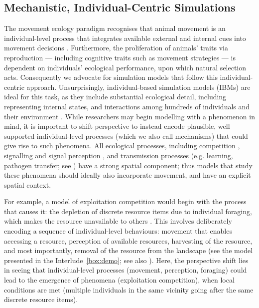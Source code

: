 \subsection*{Mechanistic, Individual-Centric Simulations}

The movement ecology paradigm recognises that animal movement is an individual-level process that integrates available external and internal cues into movement decisions \parencite{nathan2008a,holyoak2008}.
Furthermore, the proliferation of animals' traits via reproduction --- including cognitive traits such as movement strategies --- is dependent on individuals' ecological performance, upon which natural selection acts.
Consequently we advocate for simulation models that follow this individual-centric approach.
Unsurprisingly, individual-based simulation models (IBMs) are ideal for this task, as they include substantial ecological detail, including representing internal states, and interactions among hundreds of individuals and their environment \parencite{huston1988,deangelis2005,deangelis2018,deangelis2019}.
While researchers may begin modelling with a phenomenon in mind, it is important to shift perspective to instead encode plausible, well supported individual-level processes (which we also call mechanisms) that could give rise to such phenomena.
All ecological processes, including competition \parencite{keddy2001}, signalling and signal perception \parencite{torney2011}, and transmission processes (e.g. learning, pathogen transfer; see \cite{cantor2021,romano2021}) have a strong spatial component; thus models that study these phenomena should ideally also incorporate movement, and have an explicit spatial context.

For example, a model of exploitation competition would begin with the process that causes it: the depletion of discrete resource items due to individual foraging, which makes the resource unavailable to others \parencite{keddy2001}.
This involves deliberately encoding a sequence of individual-level behaviours: movement that enables accessing a resource, perception of available resources, harvesting of the resource, and most importantly, removal of the resource from the landscape (see the model presented in the Interlude~\ref{box:demo}; see also \cite{spiegel2017,gupte2021a,gupte2022c}).
Here, the perspective shift lies in seeing that individual-level processes (movement, perception, foraging) could lead to the emergence of phenomena (exploitation competition), when local conditions are met (multiple individuals in the same vicinity going after the same discrete resource items).

